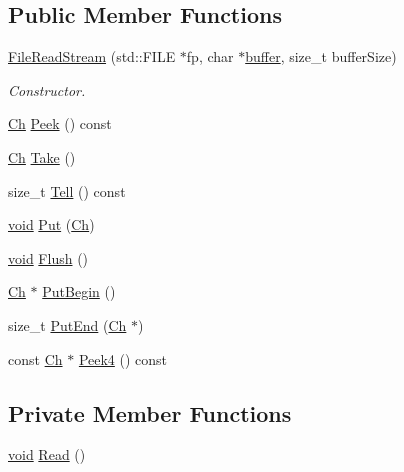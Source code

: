 \subsection*{Public Member Functions}
\begin{DoxyCompactItemize}
\item 
\hyperlink{classFileReadStream_adf91191843d50b900f43cb4f35f16f67}{File\+Read\+Stream} (std\+::\+F\+I\+LE $\ast$fp, char $\ast$\hyperlink{imgui__impl__opengl3__loader_8h_a3667f558219c90437106b544a3ca00b8}{buffer}, size\+\_\+t buffer\+Size)
\begin{DoxyCompactList}\small\item\em Constructor. \end{DoxyCompactList}\item 
\hyperlink{classFileReadStream_ae1f83d9ca3c76d1d151af0b6c427f046}{Ch} \hyperlink{classFileReadStream_ab7d47da8952d3fe5856a261ec3c020c9}{Peek} () const
\item 
\hyperlink{classFileReadStream_ae1f83d9ca3c76d1d151af0b6c427f046}{Ch} \hyperlink{classFileReadStream_addcbccc9d86ccbbe6d8e876ba595dbcb}{Take} ()
\item 
size\+\_\+t \hyperlink{classFileReadStream_ae82cfaafe347286b3af8976548bedf86}{Tell} () const
\item 
\hyperlink{imgui__impl__opengl3__loader_8h_ac668e7cffd9e2e9cfee428b9b2f34fa7}{void} \hyperlink{classFileReadStream_a4f2eac5b08033b1527bff517be657a36}{Put} (\hyperlink{classFileReadStream_ae1f83d9ca3c76d1d151af0b6c427f046}{Ch})
\item 
\hyperlink{imgui__impl__opengl3__loader_8h_ac668e7cffd9e2e9cfee428b9b2f34fa7}{void} \hyperlink{classFileReadStream_acd031e3f578b23bc2a792ac41e1e95ae}{Flush} ()
\item 
\hyperlink{classFileReadStream_ae1f83d9ca3c76d1d151af0b6c427f046}{Ch} $\ast$ \hyperlink{classFileReadStream_ac985850ab75f204dc08a01d12a8ef5c6}{Put\+Begin} ()
\item 
size\+\_\+t \hyperlink{classFileReadStream_a886660c89f698ff913d641d61466108f}{Put\+End} (\hyperlink{classFileReadStream_ae1f83d9ca3c76d1d151af0b6c427f046}{Ch} $\ast$)
\item 
const \hyperlink{classFileReadStream_ae1f83d9ca3c76d1d151af0b6c427f046}{Ch} $\ast$ \hyperlink{classFileReadStream_a03f0b804c4c96762d0c6ef536337b7f0}{Peek4} () const
\end{DoxyCompactItemize}
\subsection*{Private Member Functions}
\begin{DoxyCompactItemize}
\item 
\hyperlink{imgui__impl__opengl3__loader_8h_ac668e7cffd9e2e9cfee428b9b2f34fa7}{void} \hyperlink{classFileReadStream_a9213039798b7a07275a451f96a42361a}{Read} ()
\end{DoxyCompactItemize}
